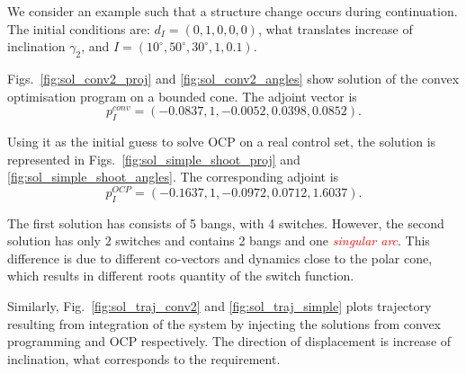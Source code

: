 \documentclass[AMA,STIX1COL]{WileyNJD-v2}
\newcommand{\redtext}{\textcolor{red}}
\newcommand{\rem}[1]{\redtext{\sl{#1}}}
\newcommand{\mybar}[1]{#1}
\begin{document}

We consider an example such that a structure change occurs during continuation. The initial conditions are: $d_I = (0,1,0,0,0)$, what translates increase of inclination $\gamma_2$, and $ \mybar{I} = (10^\circ, 50^\circ, 30^\circ, 1, 0.1)$.

Figs.~\ref{fig:sol_conv2_proj} and \ref{fig:sol_conv2_angles} show solution of the convex optimisation program on a bounded cone. The adjoint vector is
$$p_{I}^{conv} = (-0.0837,    1,   -0.0052,    0.0398,    0.0852).$$

Using it as the initial guess to solve \ac{OCP} on a real control set, the solution is represented in Figs.~\ref{fig:sol_simple_shoot_proj} and \ref{fig:sol_simple_shoot_angles}. The corresponding adjoint is
$$p_{I}^{OCP} = (-0.1637,  1,         -0.0972,  0.0712,  1.6037).$$

The first solution has consists of 5 bangs, with 4 switches. However, the second solution has only 2 switches and contains 2 bangs and one \rem{singular arc}. This difference is due to different co-vectors and dynamics close to the polar cone, which results in different roots quantity of the switch function.  

Similarly, Fig.~\ref{fig:sol_traj_conv2} and \ref{fig:sol_traj_simple} plots trajectory resulting from integration of the system by injecting the solutions from convex programming and \ac{OCP} respectively. The direction of displacement is increase of inclination, what corresponds to the requirement.
\end{document}
